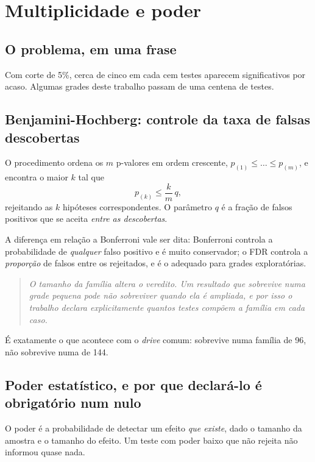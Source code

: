 \chapter{Multiplicidade e poder}
\label{cap:multiplicidade}

\section{O problema, em uma frase}

Com corte de 5\%, cerca de cinco em cada cem testes aparecem significativos por
acaso. Algumas grades deste trabalho passam de uma centena de testes.

\section{Benjamini-Hochberg: controle da taxa de falsas descobertas}

O procedimento ordena os $m$ p-valores em ordem crescente,
$p_{(1)} \leq \dots \leq p_{(m)}$, e encontra o maior $k$ tal que
\begin{equation}
p_{(k)} \leq \frac{k}{m}\, q ,
\end{equation}
rejeitando as $k$ hipóteses correspondentes. O parâmetro $q$ é a fração de
falsos positivos que se aceita \emph{entre as descobertas}.

A diferença em relação a Bonferroni vale ser dita: Bonferroni controla a
probabilidade de \emph{qualquer} falso positivo e é muito conservador; o FDR
controla a \emph{proporção} de falsos entre os rejeitados, e é o adequado para
grades exploratórias.

\begin{quote}\itshape\color{cortinta}
O tamanho da família altera o veredito. Um resultado que sobrevive numa grade
pequena pode não sobreviver quando ela é ampliada, e por isso o trabalho
declara explicitamente quantos testes compõem a família em cada caso.
\end{quote}

É exatamente o que acontece com o \emph{drive} comum: sobrevive numa família de
96, não sobrevive numa de 144.

\section{Poder estatístico, e por que declará-lo é obrigatório num nulo}

O poder é a probabilidade de detectar um efeito \emph{que existe}, dado o
tamanho da amostra e o tamanho do efeito. Um teste com poder baixo que não
rejeita não informou quase nada.

